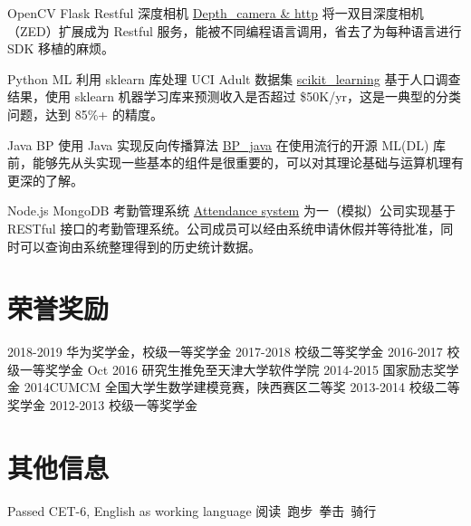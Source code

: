\documentclass[utf8]{twentysecondcv} %
\begin{document}
\begin{twenty}
		\twentyitem
        {OpenCV}
        {Flask}
        {Restful 深度相机}
        {\href{https://github.com/MiaoDX/depth\_camera}{Depth\_camera \& http}}
        {}
        {将一双目深度相机（ZED）扩展成为 Restful 服务，能被不同编程语言调用，省去了为每种语言进行 SDK 移植的麻烦。}

	    \twentyitem
        {Python}
		{ML}
        {利用 sklearn 库处理 UCI Adult 数据集}
        {\href{https://github.com/MiaoDX/scikit\_learning/}{scikit\_learning}}
        {}
		{基于人口调查结果，使用 sklearn 机器学习库来预测收入是否超过 \$50K/yr，这是一典型的分类问题，达到 85\%+ 的精度。}
		
        \twentyitem
        {Java}
       	{BP}
        {使用 Java 实现反向传播算法}
        {\href{https://github.com/MiaoDX/bp_java}{BP\_java}}
        {}                
        {在使用流行的开源 ML(\/DL) 库前，能够先从头实现一些基本的组件是很重要的，可以对其理论基础与运算机理有更深的了解。}
		
		\twentyitem
        {Node.js}
        {MongoDB}
        {考勤管理系统}
        {\href{https://github.com/SEAPC2016/attendance}{Attendance system}}
        {}
        {为一（模拟）公司实现基于 RESTful 接口的考勤管理系统。公司成员可以经由系统申请休假并等待批准，同时可以查询由系统整理得到的历史统计数据。}

\end{twenty}

\section{荣誉奖励}

\begin{twentyshort}
    \twentyitemshort
        {2018-2019}
        {华为奖学金，校级一等奖学金}
    \twentyitemshort
        {2017-2018}
        {校级二等奖学金}
	\twentyitemshort
        {2016-2017}
        {校级一等奖学金}
	\twentyitemshort
		{Oct 2016}        
		{研究生推免至天津大学软件学院}
	\twentyitemshort
		{2014-2015}
		{国家励志奖学金}
	\twentyitemshort
		{2014CUMCM}
		{全国大学生数学建模竞赛，陕西赛区二等奖}
	\twentyitemshort
		{2013-2014}
		{校级二等奖学金}		
	\twentyitemshort
		{2012-2013}
		{校级一等奖学金}		
\end{twentyshort}        


\section{其他信息}


\begin{twentyshort}
    \twentyitemshort
        {Passed CET-6, English as working language}
        {}
	\twentyitemshort
        {阅读\ 跑步\ 拳击\ 骑行}
        {}
\end{twentyshort}        
\end{document}
